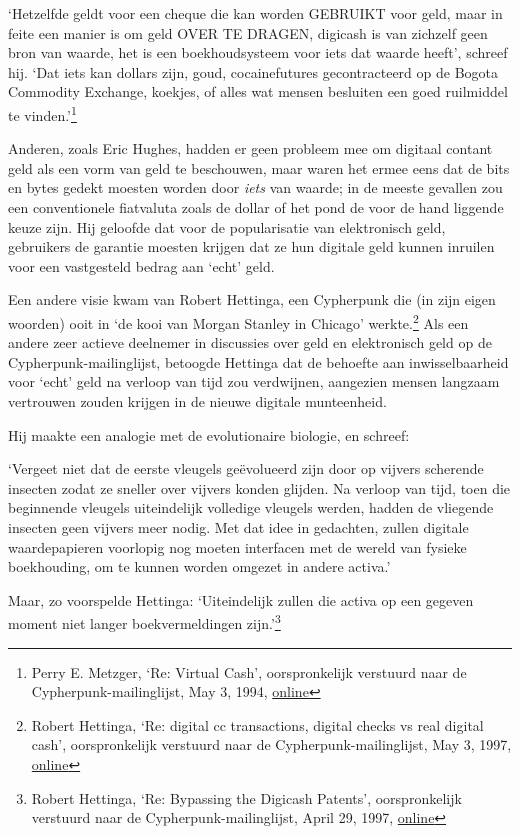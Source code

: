 \documentclass[
  a5paper,
  smalldemyvopaper,11pt,twoside,onecolumn,openright,extrafontsizes,
hidelinks]{memoir}
\begin{document}
`Hetzelfde geldt voor een cheque die kan worden GEBRUIKT voor geld, maar
in feite een manier is om geld OVER TE DRAGEN, digicash is van zichzelf
geen bron van waarde, het is een boekhoudsysteem voor iets dat waarde
heeft', schreef hij. `Dat iets kan dollars zijn, goud, cocainefutures
gecontracteerd op de Bogota Commodity Exchange, koekjes, of alles wat
mensen besluiten een goed ruilmiddel te vinden.'\footnote{Perry E.
  Metzger, `Re: Virtual Cash', oorspronkelijk verstuurd naar de
  Cypherpunk-mailinglijst, May 3, 1994,
  \href{https://cypherpunks.venona.com/date/1994/05/msg00131.html}{online}}

Anderen, zoals Eric Hughes, hadden er geen probleem mee om digitaal
contant geld als een vorm van geld te beschouwen, maar waren het ermee
eens dat de bits en bytes gedekt moesten worden door \emph{iets} van
waarde; in de meeste gevallen zou een conventionele fiatvaluta zoals de
dollar of het pond de voor de hand liggende keuze zijn. Hij geloofde dat
voor de popularisatie van elektronisch geld, gebruikers de garantie
moesten krijgen dat ze hun digitale geld kunnen inruilen voor een
vastgesteld bedrag aan `echt' geld.

Een andere visie kwam van Robert Hettinga, een Cypherpunk die (in zijn
eigen woorden) ooit in `de kooi van Morgan Stanley in Chicago'
werkte.\footnote{Robert Hettinga, `Re: digital cc transactions, digital
  checks vs real digital cash', oorspronkelijk verstuurd naar de
  Cypherpunk-mailinglijst, May 3, 1997,
  \href{https://cypherpunks.venona.com/date/1997/05/msg00147.html}{online}}
Als een andere zeer actieve deelnemer in discussies over geld en
elektronisch geld op de Cypherpunk-mailinglijst, betoogde Hettinga dat
de behoefte aan inwisselbaarheid voor `echt' geld na verloop van tijd
zou verdwijnen, aangezien mensen langzaam vertrouwen zouden krijgen in
de nieuwe digitale munteenheid.

Hij maakte een analogie met de evolutionaire biologie, en schreef:

`Vergeet niet dat de eerste vleugels geëvolueerd zijn door op vijvers
scherende insecten zodat ze sneller over vijvers konden glijden. Na
verloop van tijd, toen die beginnende vleugels uiteindelijk volledige
vleugels werden, hadden de vliegende insecten geen vijvers meer nodig.
Met dat idee in gedachten, zullen digitale waardepapieren voorlopig nog
moeten interfacen met de wereld van fysieke boekhouding, om te kunnen
worden omgezet in andere activa.'

Maar, zo voorspelde Hettinga: `Uiteindelijk zullen die activa op een
gegeven moment niet langer boekvermeldingen zijn.'\footnote{Robert
  Hettinga, `Re: Bypassing the Digicash Patents', oorspronkelijk
  verstuurd naar de Cypherpunk-mailinglijst, April 29, 1997,
  \href{https://cypherpunks.venona.com/date/1997/04/msg00811.html}{online}}
\end{document}
